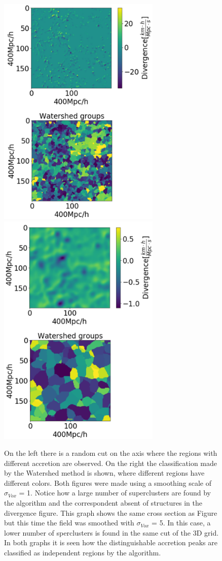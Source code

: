 \documentclass[usenatbib]{mnras}
\begin{document}
\begin{figure}
    \centering
    \includegraphics[width=220pt]{smooth_watershed_01.pdf}
    \includegraphics[width=220pt]{smooth_watershed_05.pdf}
    \caption{On the left there is a random cut on the axis where the
      regions with different accretion are observed. On the right the
      classification made by the Watershed method is shown, where
      different regions have different colors. Both figures were made
      using a smoothing scale of $\sigma_{Vox}$ = 1. Notice how a
      large number of superclusters are found by the algorithm and the
      correspondent absent of structures in the divergence figure.
      This graph shows the same cross section as Figure
       but this time the field was smoothed with
      $\sigma_{Vox}$ = 5. In this case, a lower number of sperclusters
      is found in the same cut of the 3D grid. In both graphs it is
      seen how the distinguishable accretion peaks are classified as
      independent regions by the algorithm.
    \label{fig:1Pert}}
\end{figure}
\end{document}
